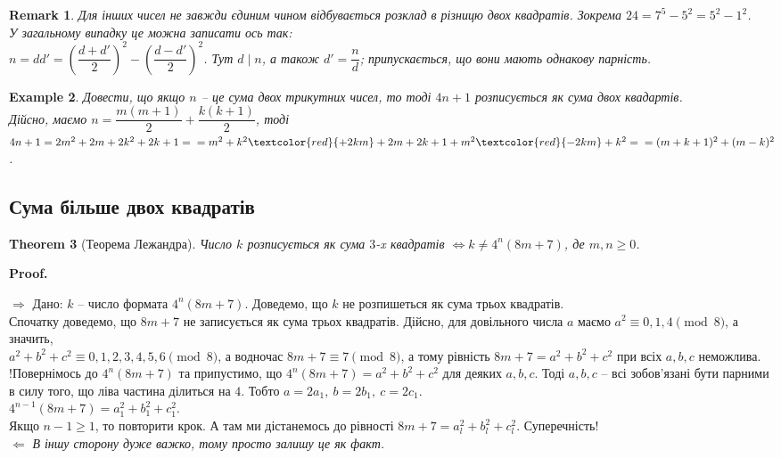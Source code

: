 \documentclass[a4paper, 10pt]{article}
\makeatletter
\theoremstyle{theoremdd}
\newtheorem{theorem}{Theorem}[subsection]
\theoremstyle{theoremdd}
\theoremstyle{theoremdd}
\theoremstyle{theoremdd}
\newtheorem{example}[theorem]{Example}
\theoremstyle{theoremdd}
\theoremstyle{theoremdd}
\newtheorem{remark}[theorem]{Remark}
\theoremstyle{theoremdd}
\theoremstyle{theoremdd}
\def\rightproof{$\boxed{\Rightarrow}$ }
\def\leftproof{$\boxed{\Leftarrow}$ }
\renewenvironment{proof}[1][Proof.\\]{\par
\pushQED{\hfill \qed}%
\normalfont \topsep6\p@\@plus6\p@\relax
\trivlist
\item\relax
{\bfseries
#1\@addpunct{.}}\hspace\labelsep\ignorespaces
}{%
\popQED\endtrivlist\@endpefalse
}
\makeatother
\begin{document}
\begin{remark}
Для інших чисел не завжди єдиним чином відбувається розклад в різницю двох квадратів. Зокрема $24 = 7^5-5^2 = 5^2-1^2$.\\
У загальному випадку це можна записати ось так:\\
$n = dd' = \left( \dfrac{d+d'}{2} \right)^2 - \left( \dfrac{d-d'}{2} \right)^2$. Тут $d \mid n$, а також $d' = \dfrac{n}{d}$; припускається, що вони мають однакову парність.
\end{remark}

\begin{example}
Довести, що якщо $n$ -- це сума двох трикутних чисел, то тоді $4n+1$ розписується як сума двох квадартів.\\
Дійсно, маємо $n = \dfrac{m(m+1)}{2} + \dfrac{k(k+1)}{2}$, тоді\\
$4n+1 = 2m^2+2m+2k^2+2k+1 = \\ = m^2+k^2\textcolor{red}{+2km} + 2m+2k + 1 + m^2 \textcolor{red}{-2km} + k^2 = \\
= (m+k+1)^2 + (m-k)^2$.
\end{example}

\subsection{Сума більше двох квадратів}
\begin{theorem}[Теорема Лежандра]
Число $k$ розписується як сума $3$-x квадратів $\iff k \neq 4^n (8m+7)$, де $m,n \geq 0$.
\end{theorem}

\begin{proof}
\rightproof Дано: $k$ -- число формата $4^n (8m+7)$. Доведемо, що $k$ не розпишеться як сума трьох квадратів.\\
Спочатку доведемо, що $8m+7$ не записується як сума трьох квадратів. Дійсно, для довільного числа $a$ маємо $a^2 \equiv 0,1,4 \pmod 8$, а значить,\\
$a^2+b^2+c^2 \equiv 0,1,2,3,4,5,6 \pmod 8$, а водночас $8m+7 \equiv 7 \pmod 8$, а тому рівність $8m+7 = a^2+b^2+c^2$ при всіх $a,b,c$ неможлива.\\
!Повернімось до $4^n (8m+7)$ та припустимо, що $4^n (8m+7) = a^2+b^2+c^2$ для деяких $a,b,c$. Тоді $a,b,c$ -- всі зобов'язані бути парними в силу того, що ліва частина ділиться на $4$. Тобто $a = 2a_1,\ b=2b_1,\ c=2c_1$.\\
$4^{n-1}(8m+7) = a_1^2 + b_1^2 + c_1^2$.\\
Якщо $n-1 \geq 1$, то повторити крок. А там ми дістанемось до рівності $8m+7 = a_l^2 + b_l^2 + c_l^2$. Суперечність!
\bigskip \\
\leftproof \textit{В іншу сторону дуже важко, тому просто залишу це як факт.}
\end{proof}
\end{document}
